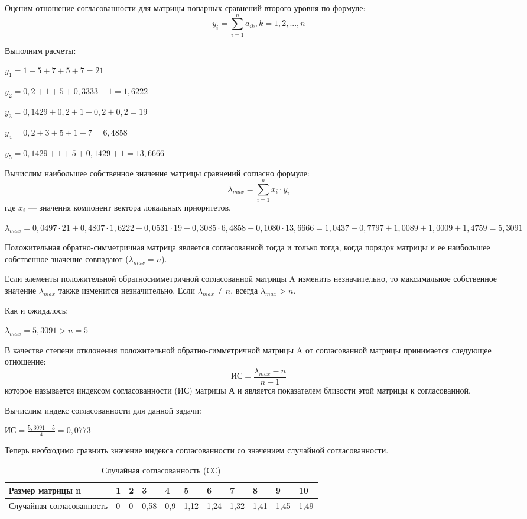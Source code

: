 Оценим отношение согласованности для матрицы попарных сравнений второго уровня по формуле:
\begin{equation}
y_i = \sum_{i=1}^{n} a_{ik}, k = 1,2,...,n
\end{equation}

Выполним расчеты:

$y_1 = 1 + 5 + 7 + 5 + 7 = 21$

$y_2 = 0,2 + 1 + 5 + 0,3333 + 1 = 1,6222$

$y_3 = 0,1429 + 0,2 + 1 + 0,2 + 0,2 = 19$

$y_4 = 0,2 + 3 + 5 + 1 + 7 = 6,4858$

$y_5 = 0,1429 + 1 + 5 + 0,1429 + 1 = 13,6666$

Вычислим наибольшее собственное значение матрицы сравнений согласно формуле:
\begin{equation}
\lambda_{max} = \sum_{i=1}^{n} x_i \cdot y_i
\end{equation}
где $x_i$ --- значения компонент вектора локальных приоритетов.

$\lambda_{max} = 0,0497 \cdot 21 + 0,4807 \cdot 1,6222 + 0,0531 \cdot 19 + 0,3085 \cdot 6,4858 +
0,1080 \cdot 13,6666 = 1,0437 + 0,7797 + 1,0089 + 1,0009 + 1,4759 = 5,3091$

Положительная обратно-симметричная матрица является согласованной тогда и только тогда, когда порядок матрицы и ее наибольшее собственное значение совпадают ($\lambda_{max} = n$).

Если элементы положительной обратносимметричной согласованной матрицы A изменить незначительно, то максимальное собственное значение $\lambda_{max}$ также изменится незначительно.
Если $\lambda_{max} \neq n$, всегда $\lambda_{max} > n$.

Как и ожидалось:

$\lambda_{max} = 5,3091 > n = 5$

В качестве степени отклонения положительной обратно-симметричной матрицы A от согласованной матрицы принимается следующее отношение:
\begin{equation}
\text{ИС} = \frac{\lambda_{max} - n}{n - 1}
\end{equation}
которое называется индексом согласованности (ИС) матрицы А и является показателем близости этой матрицы к согласованной.

Вычислим индекс согласованности для данной задачи:

$\text{ИС} = \frac{5,3091 - 5}{4} = 0,0773$

Теперь необходимо сравнить значение индекса согласованности со значением случайной согласованности.
\begin{table}[H]
  \caption{Случайная согласованность (СС)}\label{randcon}
  \begin{tabular}{|p{4cm}|l|l|l|l|l|l|l|l|l|l|}
  \hline Размер матрицы n & 1 & 2 & 3 & 4 & 5 & 6 & 7 & 8 & 9 & 10 \\
  \hline Случайная согласованность & 0 & 0 & 0,58 & 0,9 & 1,12 & 1,24 & 1,32 & 1,41 & 1,45 & 1,49 \\
  \hline
  \end{tabular}
\end{table}

